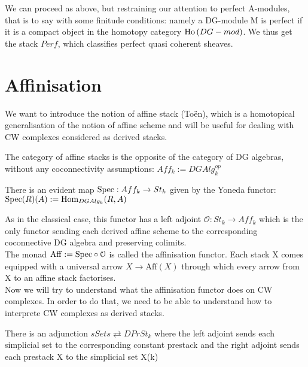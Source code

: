 \begin{refsection}
\begin{defin}
We can proceed as above, but restraining our attention to perfect A-modules, that is to say with some finitude conditions: namely a DG-module M is perfect if it is a compact object
in the homotopy category $\operatorname{\mathrm{Ho} \,}(DG-mod)$. We thus get the stack $Perf$, which classifies perfect quasi coherent sheaves.
\end{defin}

\section{Affinisation}

We want to introduce the notion of affine stack (To\"en), which is a homotopical generalisation of the notion of affine scheme and will be useful for dealing
with CW complexes considered as derived stacks.\\
\begin{defin}
The category of affine stacks is the opposite of the category of DG algebras, without any coconnectivity assumptions: $Aff_k:=DGAlg_k^{op}$
\end{defin}

\begin{rmk}
There is an evident map $\mathrm{Spec}: Aff_k \to St_k $ given by the Yoneda functor: $\mathrm{Spec}(R)(A):=\mathrm{Hom}_{DGAlg_k}(R,A)$
\end{rmk}

As in the classical case, this functor has a left adjoint $\mathcal O: St_k \to Aff_k$ which is the only functor sending each derived affine scheme to the corresponding coconnective
DG algebra and preserving colimits.\\
The monad $\mathrm{Aff}:= \mathrm{Spec}\circ\mathcal O$ is called the affinisation functor. Each stack X comes equipped with a universal arrow $X\to\mathrm{Aff}(X)$ through which every arrow
from X to an affine stack factorises.\\

Now we will try to understand what the affinisation functor does on CW complexes. In order to do that, we need to be able to understand how to interprete
CW complexes as derived stacks.\\
\begin{prop}
There is an adjunction $sSets \rightleftarrows DPrSt_k$ where the left adjoint sends each simplicial set 
to the corresponding constant prestack and the right adjoint sends each prestack X to the simplicial set X(k)
\end{prop}


\end{refsection}
